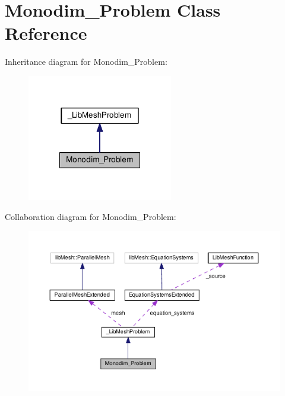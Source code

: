 \hypertarget{class_monodim___problem}{\section{Monodim\-\_\-\-Problem Class Reference}
\label{class_monodim___problem}
}


Inheritance diagram for Monodim\-\_\-\-Problem\-:\nopagebreak
\begin{figure}[H]
\begin{center}
\leavevmode
\includegraphics[width=180pt]{class_monodim___problem__inherit__graph}
\end{center}
\end{figure}


Collaboration diagram for Monodim\-\_\-\-Problem\-:\nopagebreak
\begin{figure}[H]
\begin{center}
\leavevmode
\includegraphics[width=350pt]{class_monodim___problem__coll__graph}
\end{center}
\end{figure}
